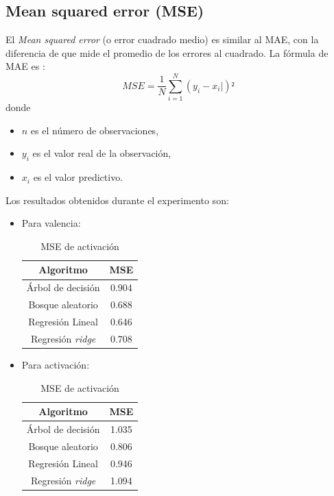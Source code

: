 \documentclass[12pt,a4paper,Spanish]{article}
\begin{document}
\subsection{Mean squared error (MSE)}
El \textit{Mean squared error} (o error cuadrado medio) es similar al MAE, con la diferencia de que mide el promedio de los errores al cuadrado. La fórmula de MAE es \cite{eswiki:159951880}:
\begin{equation}
	MSE = \frac{1}{N} \sum_{i=1}^{N} (y_i - x_i|)²
\end{equation}
donde
\begin{itemize}
	\item $n$ es el número de observaciones,
	\item $y_i$ es el valor real de la observación,
	\item $x_i$ es el valor predictivo.
\end{itemize}
Los resultados obtenidos durante el experimento son:
\begin{itemize}
	\item Para valencia:
	\begin{table}[H]
		\centering
		\caption{MSE de activación}
		\begin{tabular}{|c|c|}
			\hline
			\textbf{Algoritmo} & \textbf{MSE} \\
			\hline
			Árbol de decisión & 0.904 \\
			Bosque aleatorio & 0.688 \\
			Regresión Lineal & 0.646 \\
			Regresión \textit{ridge} & 0.708 \\
			\hline
		\end{tabular}
	\end{table}
	\item Para activación:
	\begin{table}[H]
		\centering
		\caption{MSE de activación}
		\begin{tabular}{|c|c|}
			\hline
			\textbf{Algoritmo} & \textbf{MSE} \\
			\hline
			Árbol de decisión & 1.035 \\
			Bosque aleatorio & 0.806 \\
			Regresión Lineal & 0.946 \\
			Regresión \textit{ridge} & 1.094 \\
			\hline
		\end{tabular}
	\end{table}
\end{itemize}
\end{document}

